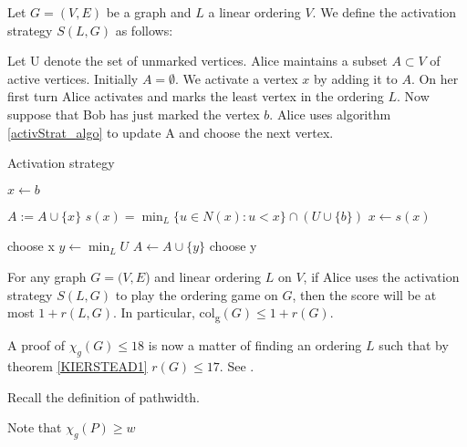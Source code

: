 \begin{definition} 
    Let $G=(V, E)$ be a graph and $L$ a linear ordering $V$. We define the activation strategy $S(L,G)$ as follows:
    
    Let U denote the set of unmarked vertices. Alice maintains a subset $A \subset V$ of active vertices. Initially $A = \emptyset$. We activate a vertex $x$ by adding it to $A$. On her first turn Alice activates and marks the least vertex in the ordering $L$. Now suppose that Bob has just marked the vertex $b$. Alice uses algorithm \ref{activStrat_algo} to update A and choose the
    next vertex.
    \begin{algorithm}[h]
        \caption{Activation strategy}
        \label{activStrat_algo}
        \begin{algorithmic}[1]
            \Statex
            \State $x \gets b$ 
            
            \State $A := A \cup \{x\}$
            \State $s(x) =\min_L\{u \in N(x) : u < x\} \cap (U \cup \{b\} )$
            \State $x \gets s(x)$
            \EndWhile      
            
            \State choose x
            \Else
            \State $y \gets \min_L U$
            \State $A \gets A \cup \{y\}$                    
            \EndIf     
            \State choose y
            \EndIf   
        \end{algorithmic}
    \end{algorithm}
    
\end{definition}


\begin{theorem} \label{KIERSTEAD1}
    For any graph $G=(V, E$) and linear ordering $L$ on $V$, if Alice uses the activation strategy $S(L, G)$ to play the ordering game on $G$, then the score will be at most $1+r(L, G)$. In particular, col\textsubscript{g}$(G) \leq 1+r(G)$.
\end{theorem}

A proof of $\chi_g(G) \leq 18$ is now a matter of finding an ordering $L$ such that by theorem \ref{KIERSTEAD1} $r(G) \leq 17$. See \cite{KIERSTEAD2000}.

Recall the definition of pathwidth.

Note that $\chi_g(P) \geq w$

